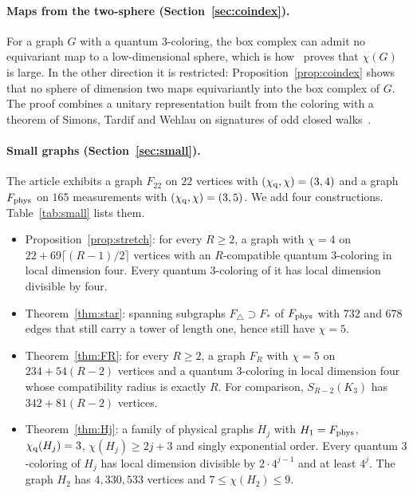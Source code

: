 \paragraph{Maps from the two-sphere (Section~\ref{sec:coindex}).}
For a graph $G$ with a quantum $3$-coloring, the box complex can admit no equivariant map to a low-dimensional sphere, which is how~\cite{Z} proves that $\chi(G)$ is large. In the other direction it is restricted: Proposition~\ref{prop:coindex} shows that no sphere of dimension two maps equivariantly into the box complex of $G$. The proof combines a unitary representation built from the coloring with a theorem of Simons, Tardif and Wehlau on signatures of odd closed walks~\cite{STW}.

\paragraph{Small graphs (Section~\ref{sec:small}).}
The article exhibits a graph $F_{22}$ on $22$ vertices with $(\chi_{\mathrm q},\chi)=(3,4)$ and a graph $F_{\rm phys}$ on $165$ measurements with $(\chi_{\mathrm q},\chi)=(3,5)$. We add four constructions. Table~\ref{tab:small} lists them.
\begin{itemize}
\item Proposition~\ref{prop:stretch}: for every $R\ge2$, a graph with $\chi=4$ on $22+69\lceil(R-1)/2\rceil$ vertices with an $R$-compatible quantum $3$-coloring in local dimension four. Every quantum $3$-coloring of it has local dimension divisible by four.
\item Theorem~\ref{thm:star}: spanning subgraphs $F_\triangle\supset F_*$ of $F_{\rm phys}$ with $732$ and $678$ edges that still carry a tower of length one, hence still have $\chi=5$.
\item Theorem~\ref{thm:FR}: for every $R\ge2$, a graph $F_R$ with $\chi=5$ on $234+54(R-2)$ vertices and a quantum $3$-coloring in local dimension four whose compatibility radius is exactly $R$. For comparison, $S_{R-2}(K_3)$ has $342+81(R-2)$ vertices.
\item Theorem~\ref{thm:Hj}: a family of physical graphs $H_j$ with $H_1=F_{\rm phys}$, $\chi_{\mathrm q}(H_j)=3$, $\chi(H_j)\ge2j+3$ and singly exponential order. Every quantum $3$-coloring of $H_j$ has local dimension divisible by $2\cdot4^{j-1}$ and at least $4^j$. The graph $H_2$ has $4{,}330{,}533$ vertices and $7\le\chi(H_2)\le9$.
\end{itemize}

